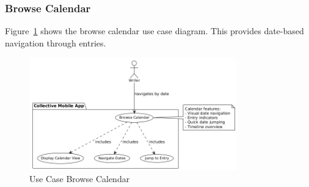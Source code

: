 \subsubsection{Browse Calendar}

Figure~\ref{fig:usecase-browse-calendar} shows the browse calendar use case diagram. This provides date-based navigation through entries.

\begin{figure}[H]
\centering
\includegraphics[width=0.8\textwidth]{files/imgs/usecase_U9ojaarFma.png}
\caption{Use Case Browse Calendar}
\label{fig:usecase-browse-calendar}
\end{figure}

